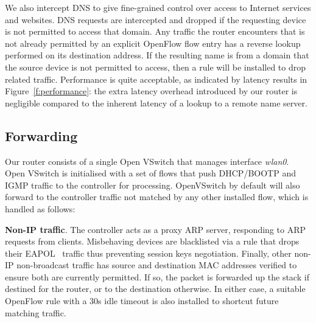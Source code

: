 We also intercept DNS to give fine-grained control over access to Internet
services and websites.  DNS requests are intercepted and dropped if the
requesting device is not permitted to access that domain.  Any traffic the
router encounters that is not already permitted by an explicit OpenFlow flow
entry has a reverse lookup performed on its destination address.  If the
resulting name is from a domain that the source device is not permitted to
access, then a rule will be installed to drop related traffic.  Performance is
quite acceptable, as indicated by latency results in Figure~\ref{f:performance}:
the extra latency overhead introduced by our router is negligible compared to
the inherent latency of a lookup to a remote name server.  

\subsection{Forwarding} \label{s:forwarding}
 
Our router consists of a single Open VSwitch that manages interface
\emph{wlan0}.  Open VSwitch is initialised with a set of flows that push
DHCP/BOOTP and IGMP traffic to the controller for processing.
OpenVSwitch by default will also forward to the controller traffic not matched
by any other installed flow, which is handled as follows:

\textbf{Non-IP traffic}.  The controller acts as a proxy ARP server, responding
to ARP requests from clients.  Misbehaving devices are blacklisted via a rule
that drops their EAPOL~\cite{rfc:3748} traffic thus preventing session keys
negotiation.
Finally, other non-IP non-broadcast traffic has source and destination MAC addresses verified
to ensure both are currently permitted.  If so, the packet is forwarded up the
stack if destined for the router, or to the destination otherwise.  In either
case, a suitable OpenFlow rule with a 30s idle timeout is also installed to
shortcut future matching traffic.

